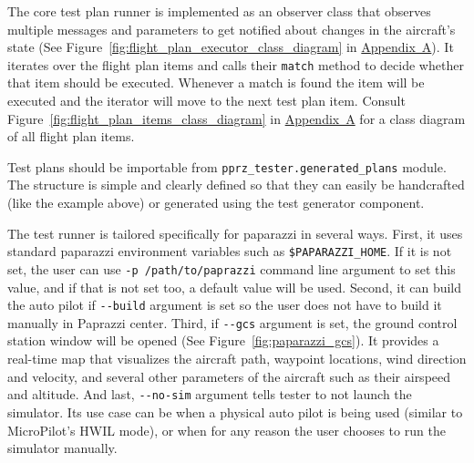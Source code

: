 The core test plan runner is implemented as an observer class that observes multiple messages and parameters to get notified about changes in the aircraft's state (See Figure~\ref{fig:flight_plan_executor_class_diagram} in \hyperref[appendixa]{Appendix~A}). It iterates over the flight plan items and calls their \verb|match| method to decide whether that item should be executed. Whenever a match is found the item will be executed and the iterator will move to the next test plan item. Consult Figure~\ref{fig:flight_plan_items_class_diagram} in \hyperref[appendixa]{Appendix~A} for a class diagram of all flight plan items.

Test plans should be importable from \verb|pprz_tester.generated_plans| module. The structure is simple and clearly defined so that they can easily be handcrafted (like the example above) or generated using the test generator component.

The test runner is tailored specifically for paparazzi in several ways. First, it uses standard paparazzi environment variables such as \verb|$PAPARAZZI_HOME|. If it is not set, the user can use \verb|-p /path/to/paprazzi| command line argument to set this value, and if that is not set too, a default value will be used. Second, it can build the auto pilot if \verb|--build| argument is set so the user does not have to build it manually in Paprazzi center. Third, if \verb|--gcs| argument is set, the ground control station window will be opened (See Figure~\ref{fig:paparazzi_gcs}). It provides a real-time map that visualizes the aircraft path, waypoint locations, wind direction and velocity, and several other parameters of the aircraft such as their airspeed and altitude. And last, \verb|--no-sim| argument tells tester to not launch the simulator. Its use case can be when a physical auto pilot is being used (similar to MicroPilot's HWIL mode), or when for any reason the user chooses to run the simulator manually. 

